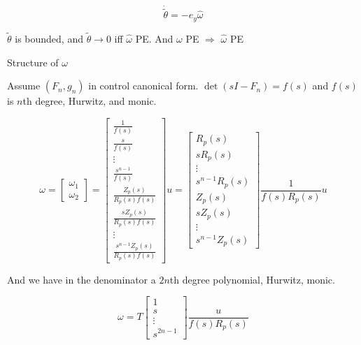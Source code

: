 \begin{equation*}
  \dot{\tilde{\theta}}=-e_{y}\hat{\omega}
\end{equation*}

$\tilde{\theta}$ is bounded, and $\tilde{\theta}\rightarrow0$ iff $\hat{\omega}$ PE.\@
And $\omega$ PE $\Rightarrow$ $\hat{\omega}$ PE

Structure of $\omega$


Assume $(F_{n},g_{n})$ in control canonical form.
$\det(sI-F_{n})=f(s)$ and $f(s)$ is $n$th degree, Hurwitz, and monic.

\begin{equation*}
  \omega
  =
  \begin{bmatrix}
    \omega_{1} \\
    \omega_{2}
  \end{bmatrix}
  =
  \begin{bmatrix}
    \frac{1}{f(s)} \\
    \frac{s}{f(s)} \\
    \vdots \\
    \frac{s^{n-1}}{f(s)} \\
    \frac{Z_{p}(s)}{R_{p}(s)f(s)} \\
    \frac{sZ_{p}(s)}{R_{p}(s)f(s)} \\
    \vdots \\
    \frac{s^{n-1}Z_{p}(s)}{R_{p}(s)f(s)}
  \end{bmatrix}
  u=
  \begin{bmatrix}
    R_{p}(s) \\
    sR_{p}(s) \\
    \vdots \\
    s^{n-1}R_{p}(s) \\
    Z_{p}(s) \\
    sZ_{p}(s) \\
    \vdots \\
    s^{n-1}Z_{p}(s)
  \end{bmatrix}
  \frac{1}{f(s)R_{p}(s)}u
\end{equation*}

And we have in the denominator a $2n$th degree polynomial, Hurwitz, monic.

\begin{equation*}
\omega=T
\begin{bmatrix}
  1 \\
  s \\
  \vdots \\
  s^{2n-1}
\end{bmatrix}
\frac{u}{f(s)R_{p}(s)}
\end{equation*}

